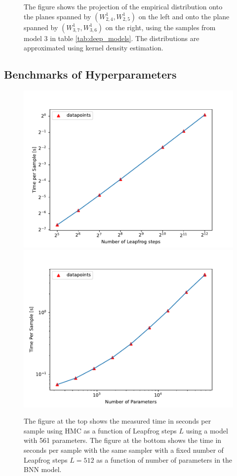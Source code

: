 \begin{figure}
    \caption{The figure shows the projection of the empirical distribution onto the planes spanned by $(W_{2,4}^1, W_{2,5}^1)$ on the left and onto the plane spanned by $(W_{3,7}^1, W_{3, 6}^1)$ on the right, using the samples from model 3 in table \ref{tab:deep_models}. The distributions are approximated using kernel density estimation. 
    }
    \label{fig:posterior_kernels}
\end{figure}


\subsection{Benchmarks of Hyperparameters}\label{subsec:benchmarks}
\begin{figure}
    \centering
    \includegraphics[scale=0.7]{figures/computational_cost/time_vs_leapfrogsteps_hmc.pdf}
    \includegraphics[scale=0.7]{figures/computational_cost/time_vs_params.pdf}
    \caption{The figure at the top shows the measured time in seconds per sample using HMC as a function of Leapfrog steps $L$ using a model with
    561 parameters. The figure at the bottom shows the time in seconds per sample with the same sampler with a fixed number of Leapfrog steps $L = 512$ as a function of number of parameters in the BNN model.
    }
    \label{fig:time_vs_leapfrogsteps}
\end{figure}

